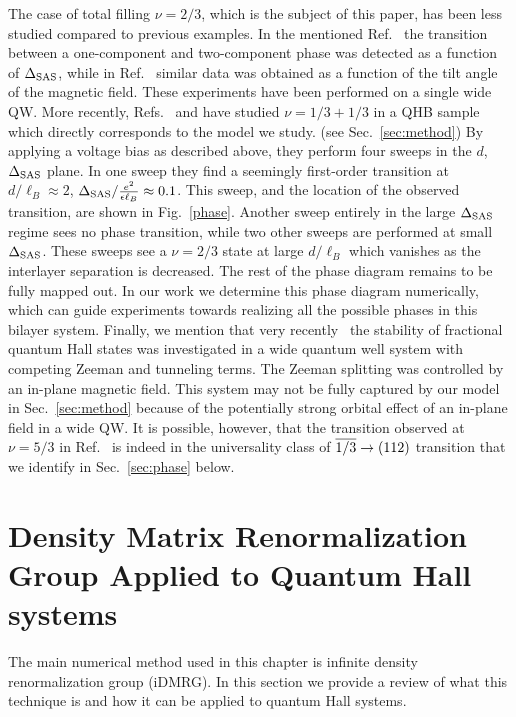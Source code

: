 The case of total filling $\nu=2/3$, which is the subject of this paper, has been less studied compared to previous examples.
In the mentioned Ref.~\cite{Suen94} the transition between a one-component and two-component phase was detected as a function of $\Delta_\textrm{SAS}$, while in Ref.~\cite{Lay97} similar data was obtained as a function of the tilt angle of the magnetic field.
These experiments have been performed on a single wide QW.
More recently, Refs.~\cite{Hirayama2002b} and \cite{Hirayama2004} have studied $\nu=1/3+1/3$ in a QHB sample which directly corresponds to the model we study. (see Sec.~\ref{sec:method})
By applying a voltage bias as described above, they perform four sweeps in the $d$, $\Delta_\textrm{SAS}$ plane. 
In one sweep \cite{Hirayama2002b} they find a seemingly first-order transition at $d/\ell_B\approx2$, $\Delta_\textrm{SAS}/\frac{e^2}{\epsilon\ell_B}\approx0.1$.
This sweep, and the location of the observed transition, are shown in Fig.~\ref{phase}.
Another sweep entirely in the large $\Delta_\textrm{SAS}$ regime sees no phase transition, while two other sweeps are performed at small $\Delta_\textrm{SAS}$.
These sweeps see a $\nu=2/3$ state at large $d/\ell_B$ which vanishes as the interlayer separation is decreased.
The rest of the phase diagram remains to be fully mapped out.
In our work we determine this phase diagram numerically, which can guide experiments towards realizing all the possible phases in this bilayer system.
Finally, we mention that very recently~\cite{Liu15} the stability of fractional quantum Hall states was investigated in a wide quantum well system with competing Zeeman and tunneling terms.
The Zeeman splitting was controlled by an in-plane magnetic field.
This system may not be fully captured by our model in Sec.~\ref{sec:method} because of the potentially strong orbital effect of an in-plane field in a wide QW.
It is possible, however, that the transition observed at $\nu=5/3$ in Ref.~\cite{Liu15} is indeed in the universality class of $\overline{1/3} \to (112)$ transition that we identify in Sec.~\ref{sec:phase} below.  


\section{Density Matrix Renormalization Group Applied to Quantum Hall systems}

The main numerical method used in this chapter is infinite density renormalization group (iDMRG). In this section we provide a review of what this technique is and how it can be applied to quantum Hall systems.

